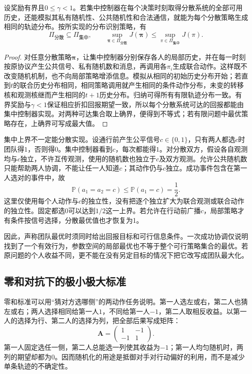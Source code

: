 \begin{theorem}[集中与分散策略的可行集合]
\label{thm:rl-multi-agent-inclusion}
设奖励有界且$0\leq\gamma<1$。若集中控制器在每个决策时刻取得分散系统的全部可用历史，还能模拟其私有随机性、公共随机性和合法通信，就能为每个分散策略生成相同的轨迹分布。按所实现的分布识别策略，有
\[
 \Pi_{\text{分散}}\subseteq\Pi_{\text{集中}},
 \qquad
 \sup_{\bm\pi\in\Pi_{\text{分散}}}J(\bm\pi)
 \leq
 \sup_{\pi\in\Pi_{\text{集中}}}J(\pi).
\]
\end{theorem}
\begin{proof}
对任意分散策略$\bm\pi$，让集中控制器分别保存各人的局部历史，并在每一时刻按原协议产生公共信号、私有随机数和消息，再调用各$\pi_i$生成联合动作。这样既不改变随机机制，也不向局部策略增添信息。模拟从相同的初始历史分布开始；若直到$t$的联合历史分布相同，相同策略调用就产生相同的条件动作分布，未变的转移核和观测核继而产生相同的$t+1$历史分布。归纳可得所有有限轨迹分布一致。有界奖励与$\gamma<1$保证相应折扣回报期望一致，所以每个分散系统可达的回报都能由集中控制器实现。对两种可达集合取上确界，便得到不等式；若有限问题中最优策略存在，上确界可写成最大值。
\end{proof}

集中上界不一定能分散实现。设通行前产生公平信号$c\in\{0,1\}$，只有两人都选$c$时团队得$1$，否则得$0$。集中控制器看到$c$，每次都能得$1$。对分散双方，假设各自观测均与$c$独立，不许互传观测，使用的随机数也独立于$c$及双方观测。允许公共随机数只能帮助两人协调，不能让任一人知道$c$；其动作仍与$c$独立。成功事件包含在第一人选对的事件中，故
\[
 \mathbb P(a_1=a_2=c)\leq\mathbb P(a_1=c)=\frac12.
\]
这里仅使用每个人动作与$c$的独立性，没有把逐个独立扩大为联合观测或联合动作的独立性。固定都选0可以达到$1/2$这一上界。若允许在行动前广播$c$，局部策略才有条件按信号选择，分散最优值也才恢复为1。

因此，声称团队最优时须同时给出回报目标和可行信息条件。一次成功协调仅说明找到了一个有效行为，参数空间的局部最优也不等于整个可行策略集合的最优。若原问题的个人收益不同，更不能在没有另定目标的情况下把它改写成团队最大化。

\subsection{零和对抗下的极小极大标准}
\label{sec:rl-multi-agent-minimax}

零和标准可以用“猜对方选哪侧”的两动作任务说明。第一人选左或右，第二人也猜左或右；两人选择相同给第一人$1$，不同给第一人$-1$，第二人取相反收益。以第一人的选择为行、第二人的选择为列，把全部后果写成矩阵：
\begin{equation}
 \bm A=
 \begin{pmatrix}1&-1\\-1&1\end{pmatrix}.
 \label{eq:rl-multi-agent-matching}
\end{equation}
第一人固定选任一侧，第二人总能选一列使其收益为$-1$；第一人均匀随机时，两列的期望却都为0。因而随机化的用途是抵御对手对行动偏好的利用，而不是减少单条轨迹的不确定性。

